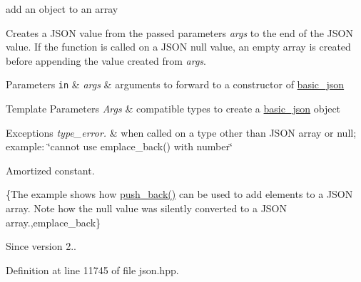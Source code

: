 add an object to an array 

Creates a J\+S\+ON value from the passed parameters {\itshape args} to the end of the J\+S\+ON value. If the function is called on a J\+S\+ON null value, an empty array is created before appending the value created from {\itshape args}.


\begin{DoxyParams}[1]{Parameters}
\mbox{\tt in}  & {\em args} & arguments to forward to a constructor of \hyperlink{classnlohmann_1_1basic__json}{basic\+\_\+json} \\
\hline
\end{DoxyParams}

\begin{DoxyTemplParams}{Template Parameters}
{\em Args} & compatible types to create a \hyperlink{classnlohmann_1_1basic__json}{basic\+\_\+json} object\\
\hline
\end{DoxyTemplParams}

\begin{DoxyExceptions}{Exceptions}
{\em type\+\_\+error.} & when called on a type other than J\+S\+ON array or null; example\+: {\ttfamily \char`\"{}cannot use emplace\+\_\+back() with number\char`\"{}}\\
\hline
\end{DoxyExceptions}
Amortized constant.

\{The example shows how {\ttfamily \hyperlink{classnlohmann_1_1basic__json_ac8e523ddc8c2dd7e5d2daf0d49a9c0d7}{push\+\_\+back()}} can be used to add elements to a J\+S\+ON array. Note how the {\ttfamily null} value was silently converted to a J\+S\+ON array.,emplace\+\_\+back\}

\begin{DoxySince}{Since}
version 2.. 
\end{DoxySince}


Definition at line 11745 of file json.\+hpp.

